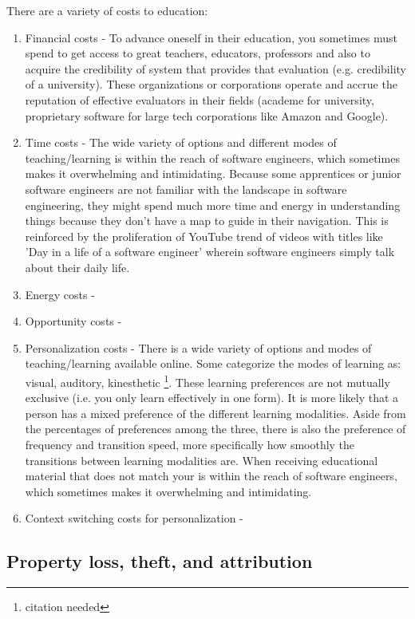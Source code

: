 \documentclass[journal, onecolumn]{IEEEtran}
\begin{document}
There are a variety of costs to education:

\begin{enumerate}
  \item Financial costs - To advance oneself in their education, you sometimes must
  spend to get access to great teachers, educators, professors and also to acquire
  the credibility of system that provides that evaluation (e.g. credibility of
  a university). These organizations or corporations operate and accrue the 
  reputation of effective evaluators in their fields (academe for university,
  proprietary software for large tech corporations like Amazon and Google).
  \item Time costs - The wide variety of 
  options and different modes of teaching/learning is within the reach of 
  software engineers, which sometimes makes it overwhelming and intimidating. 
  Because some apprentices or junior software engineers are not familiar with
  the landscape in software engineering, they might spend much more time and
  energy in understanding things because they don't have a map to guide in 
  their navigation. This is reinforced by the proliferation of YouTube trend
  of videos with titles like 'Day in a life of a  software engineer' wherein
  software engineers simply talk about their daily life.
  \item Energy costs - 
  \item Opportunity costs - 
  \item Personalization costs - There is a wide variety of options and modes 
  of teaching/learning available online. Some categorize the modes of learning as:
  visual, auditory, kinesthetic \footnote{citation needed}. These learning 
  preferences are not mutually exclusive (i.e. you only learn effectively in one
  form). It is more likely that a person has a mixed preference of the different
  learning modalities. Aside from the percentages of preferences among the three,
  there is also the preference of frequency and transition speed, more specifically
  how smoothly the transitions
  between learning modalities are. When receiving 
  educational material that does not match your  is within the reach of 
  software engineers, which sometimes makes it overwhelming and intimidating. 
  \item Context switching costs for personalization - 
\end{enumerate}

\subsection{Property loss, theft, and attribution}
\end{document}
